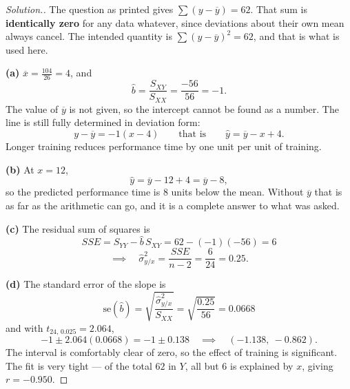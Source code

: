 \documentclass[11pt,a4paper]{article}
\theoremstyle{definition}
\newenvironment{solution}
  {\renewcommand{\qedsymbol}{}\begin{proof}[\textit{Solution}.]}
  {\end{proof}}
\begin{document}
\begin{solution}
The question as printed gives $\sum(y-\overline{y})=62$. That sum is \textbf{identically
zero} for any data whatever, since deviations about their own mean always cancel. The
intended quantity is $\sum(y-\overline{y})^2=62$, and that is what is used here.

\textbf{(a)} $\overline{x}=\frac{104}{26}=4$, and
\[\widehat{b}=\frac{S_{XY}}{S_{XX}}=\frac{-56}{56}=-1.\]
The value of $\overline{y}$ is not given, so the intercept cannot be found as a number. The
line is still fully determined in deviation form:
\[y-\overline{y}=-1(x-4)\qquad\text{that is}\qquad \widehat{y}=\overline{y}-x+4.\]
Longer training reduces performance time by one unit per unit of training.

\textbf{(b)} At $x=12$,
\[\widehat{y}=\overline{y}-12+4=\overline{y}-8,\]
so the predicted performance time is $8$ units below the mean. Without $\overline{y}$ that is
as far as the arithmetic can go, and it is a complete answer to what was asked.

\textbf{(c)} The residual sum of squares is
\[SSE=S_{YY}-\widehat{b}\,S_{XY}=62-(-1)(-56)=6\]
\[\implies\quad \widehat{\sigma}^2_{y/x}=\frac{SSE}{n-2}=\frac{6}{24}=0.25.\]

\textbf{(d)} The standard error of the slope is
\[\text{se}(\widehat{b})=\sqrt{\frac{\widehat{\sigma}^2_{y/x}}{S_{XX}}}=\sqrt{\frac{0.25}{56}}=0.0668\]
and with $t_{24,\,0.025}=2.064$,
\[-1\pm 2.064(0.0668)=-1\pm 0.138\quad\implies\quad (-1.138,\ -0.862).\]
The interval is comfortably clear of zero, so the effect of training is significant. The fit
is very tight --- of the total $62$ in $Y$, all but $6$ is explained by $x$, giving
$r=-0.950$.
\end{solution}
\end{document}
